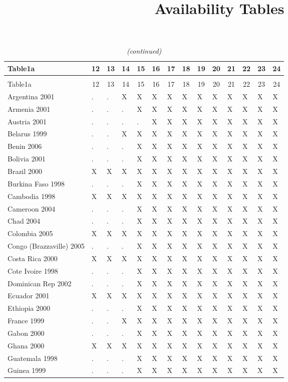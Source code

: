 \documentclass[a4paper]{article}
\begin{document}
\title{Availability Tables}
\maketitle


\pagebreak
%

\setlongtables


\begin{longtable}{llllllllllllll} \caption{Availability In Union}\tabularnewline
 \hline\hline
\multicolumn{1}{l}{Table1a}&\multicolumn{1}{c}{12}&\multicolumn{1}{c}{13}&\multicolumn{1}{c}{14}&\multicolumn{1}{c}{15}&\multicolumn{1}{c}{16}&\multicolumn{1}{c}{17}&\multicolumn{1}{c}{18}&\multicolumn{1}{c}{19}&\multicolumn{1}{c}{20}&\multicolumn{1}{c}{21}&\multicolumn{1}{c}{22}&\multicolumn{1}{c}{23}&\multicolumn{1}{c}{24}\tabularnewline
\hline
\endfirsthead
\caption[]{\em (continued)} \tabularnewline
\hline
\multicolumn{1}{l}{Table1a}&\multicolumn{1}{c}{12}&\multicolumn{1}{c}{13}&\multicolumn{1}{c}{14}&\multicolumn{1}{c}{15}&\multicolumn{1}{c}{16}&\multicolumn{1}{c}{17}&\multicolumn{1}{c}{18}&\multicolumn{1}{c}{19}&\multicolumn{1}{c}{20}&\multicolumn{1}{c}{21}&\multicolumn{1}{c}{22}&\multicolumn{1}{c}{23}&\multicolumn{1}{c}{24}\tabularnewline
\hline
\endhead
\hline
\endfoot
\label{Table1a}
Argentina 2001&.&.&X&X&X&X&X&X&X&X&X&X&X\tabularnewline
Armenia 2001&.&.&.&X&X&X&X&X&X&X&X&X&X\tabularnewline
Austria 2001&.&.&.&.&X&X&X&X&X&X&X&X&X\tabularnewline
Belarus 1999&.&.&X&X&X&X&X&X&X&X&X&X&X\tabularnewline
Benin 2006&.&.&.&X&X&X&X&X&X&X&X&X&X\tabularnewline
Bolivia 2001&.&.&.&X&X&X&X&X&X&X&X&X&X\tabularnewline
Brazil 2000&X&X&X&X&X&X&X&X&X&X&X&X&X\tabularnewline
Burkina Faso 1998&.&.&.&X&X&X&X&X&X&X&X&X&X\tabularnewline
Cambodia 1998&X&X&X&X&X&X&X&X&X&X&X&X&X\tabularnewline
Cameroon 2004&.&.&.&X&X&X&X&X&X&X&X&X&X\tabularnewline
Chad 2004&.&.&.&X&X&X&X&X&X&X&X&X&X\tabularnewline
Colombia 2005&X&X&X&X&X&X&X&X&X&X&X&X&X\tabularnewline
Congo (Brazzaville) 2005&.&.&.&X&X&X&X&X&X&X&X&X&X\tabularnewline
Costa Rica 2000&X&X&X&X&X&X&X&X&X&X&X&X&X\tabularnewline
Cote Ivoire 1998&.&.&.&X&X&X&X&X&X&X&X&X&X\tabularnewline
Dominican Rep 2002&.&.&.&X&X&X&X&X&X&X&X&X&X\tabularnewline
Ecuador 2001&X&X&X&X&X&X&X&X&X&X&X&X&X\tabularnewline
Ethiopia 2000&.&.&.&X&X&X&X&X&X&X&X&X&X\tabularnewline
France 1999&.&.&X&X&X&X&X&X&X&X&X&X&X\tabularnewline
Gabon 2000&.&.&.&X&X&X&X&X&X&X&X&X&X\tabularnewline
Ghana 2000&X&X&X&X&X&X&X&X&X&X&X&X&X\tabularnewline
Guatemala 1998&.&.&.&X&X&X&X&X&X&X&X&X&X\tabularnewline
Guinea 1999&.&.&.&X&X&X&X&X&X&X&X&X&X\tabularnewline

\end{longtable}
\end{document}
